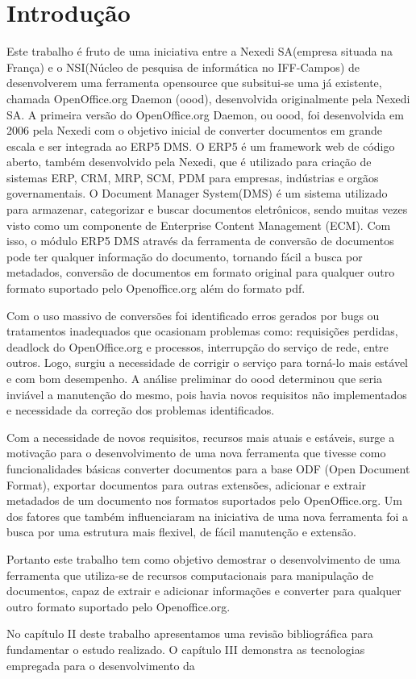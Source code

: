 \chapter{Introdução}
Este trabalho é fruto de uma iniciativa entre a Nexedi SA(empresa situada na França) e o NSI(Núcleo de pesquisa de informática no IFF-Campos) de desenvolverem uma ferramenta opensource que subsitui-se uma já existente, chamada OpenOffice.org Daemon (oood), desenvolvida originalmente pela Nexedi SA. A primeira versão do OpenOffice.org Daemon, ou oood, foi desenvolvida em 2006 pela Nexedi com o objetivo inicial de converter documentos em grande escala e ser integrada ao ERP5 DMS. O ERP5 é um framework web de código aberto, também desenvolvido pela Nexedi, que é utilizado para criação de sistemas ERP, CRM, MRP, SCM, PDM para empresas, indústrias e orgãos governamentais. O Document Manager System(DMS) é um sistema utilizado para armazenar, categorizar e buscar documentos eletrônicos, sendo muitas vezes visto como um componente de Enterprise Content Management (ECM). Com isso, o módulo ERP5 DMS através da ferramenta de conversão de documentos pode ter qualquer informação do documento, tornando fácil a busca por metadados, conversão de documentos em formato original para qualquer outro formato suportado pelo Openoffice.org além do formato pdf.

Com o uso massivo de conversões foi identificado erros gerados por bugs ou tratamentos inadequados que ocasionam problemas como: requisições perdidas, deadlock do OpenOffice.org e processos, interrupção do serviço de rede, entre outros. Logo, surgiu a necessidade de corrigir o serviço para torná-lo mais estável e com bom desempenho. A análise preliminar do oood determinou que seria inviável a manutenção do mesmo, pois havia novos requisitos não implementados e necessidade da correção dos problemas identificados.

Com a necessidade de novos requisitos, recursos mais atuais e estáveis, surge a motivação para o desenvolvimento de uma nova ferramenta que tivesse como funcionalidades básicas converter documentos para a base ODF (Open Document Format), exportar documentos para outras extensões, adicionar e extrair metadados de um documento nos formatos suportados pelo OpenOffice.org. Um dos fatores que também influenciaram na iniciativa de uma nova ferramenta foi a busca por uma estrutura mais flexivel, de fácil manutenção e extensão.

Portanto este trabalho tem como objetivo demostrar o desenvolvimento de uma ferramenta que utiliza-se de recursos computacionais para manipulação de documentos, capaz de extrair e adicionar informações e converter para qualquer outro formato suportado pelo Openoffice.org.

No capítulo II deste trabalho apresentamos uma revisão bibliográfica para fundamentar o estudo realizado. O capítulo III demonstra as tecnologias empregada para o desenvolvimento da
